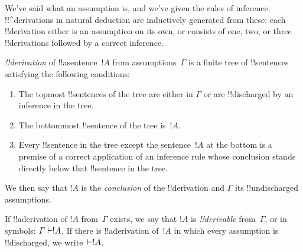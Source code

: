 \documentclass[../../../include/open-logic-section]{subfiles}
\begin{document}
      {}
      {}


\begin{explain}
We've said what an assumption is, and we've given the rules of
inference.  !!^{derivation}s in natural deduction are inductively
generated from these: each !!{derivation} either is an assumption
on its own, or consists of one, two, or three !!{derivation}s followed
by a correct inference.
\end{explain}

\begin{defn}[!!^{derivation}]
 \emph{!!{derivation}} of !!a{sentence}~$!A$ from
assumptions~$\Gamma$ is a finite tree of !!{sentence}s satisfying the
following conditions:
\begin{enumerate}
\item The topmost !!{sentence}s of the tree are either in $\Gamma$ or
  are !!{discharged} by an inference in the tree.
\item The bottommost !!{sentence} of the tree is~$!A$.
\item Every !!{sentence} in the tree except the sentence~$!A$ at
  the bottom is a premise of a correct application of an inference
  rule whose conclusion stands directly below that !!{sentence} in the
  tree.
\end{enumerate}
We then say that $!A$ is the \emph{conclusion} of the !!{derivation}
and $\Gamma$ its !!{undischarged} assumptions.

If !!a{derivation} of $!A$ from~$\Gamma$ exists, we say that $!A$ is
\emph{!!{derivable}} from~$\Gamma$, or in symbols: $\Gamma \Proves
!A$. If there is !!a{derivation} of~$!A$ in which every assumption is
!!{discharged}, we write~$\Proves !A$.
\end{defn}
\end{document}
